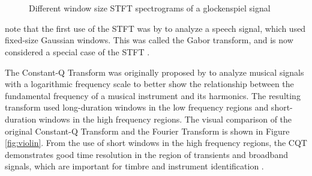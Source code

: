 \documentclass[report.tex]{subfiles}
\begin{document}
\begin{figure}[ht]
	\centering
	\\
	\\
	\caption{Different window size STFT spectrograms of a glockenspiel signal \parencite[1]{jaillet}}
	\label{fig:stfttradeoff}
\end{figure}

\textcite{dictionary} note that the first use of the STFT was by \textcite{gabor1946} to analyze a speech signal, which used fixed-size Gaussian windows. This was called the Gabor transform, and is now considered a special case of the STFT \parencite{dictionary}.

The Constant-Q Transform  was originally proposed by \textcite{jbrown} to analyze musical signals with a logarithmic frequency scale to better show the relationship between the fundamental frequency of a musical instrument and its harmonics. The resulting transform used long-duration windows in the low frequency regions and short-duration windows in the high frequency regions. The visual comparison of the original Constant-Q Transform and the Fourier Transform is shown in Figure \ref{fig:violin}. From the use of short windows in the high frequency regions, the CQT demonstrates good time resolution \parencite{cqtransient} in the region of transients and broadband signals, which are important for timbre and instrument identification \parencite{timbretransients1, timbretransients2}.
\end{document}
